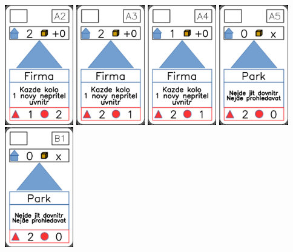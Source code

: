 \documentclass[a4paper]{article}
\begin{document}
	\includegraphics[width=3.0cm]{img-3_16}
	\includegraphics[width=3.0cm]{img-3_17}
	\includegraphics[width=3.0cm]{img-3_18}
	\includegraphics[width=3.0cm]{img-3_19}
	\includegraphics[width=3.0cm]{img-3_20}
\end{document}
